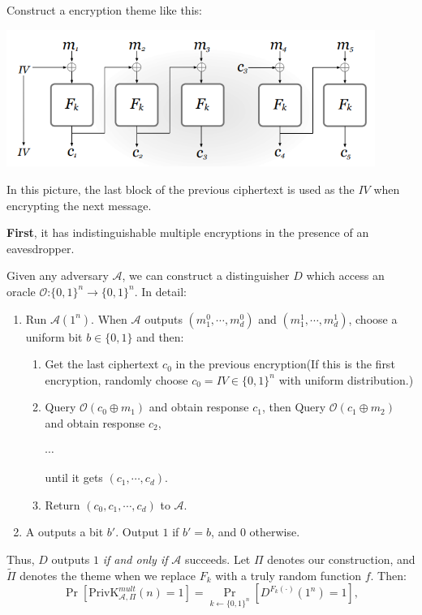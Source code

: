 \documentclass[12pt]{article}
\newcommand{\privk}{\text{PrivK}}
\newcommand{\A}{\mathcal{A}}
\newcommand{\OO}{\mathcal{O}}
\newenvironment{problem}[2][Problem]{\begin{trivlist}
\item[\hskip \labelsep {\bfseries #1}\hskip \labelsep {\bfseries #2.}]}{\end{trivlist}}
\begin{document}
\begin{problem}{3.11}
Construct a encryption theme like this:\par
\begin{center}
    \includegraphics[width=12cm]{1.png}
\end{center}
In this picture, the last block of the previous ciphertext is used
as the $IV$ when encrypting the next message.\par\vspace{2ex}
\textbf{First}, it has indistinguishable multiple encryptions in
the presence of an eavesdropper.\par
Given any adversary $\A$, we can construct a distinguisher $D$ which access an oracle $\OO$:$\{0,1\}^n\rightarrow\{0,1\}^n$. In detail:
\begin{enumerate}
    \item Run $\A(1^n)$. When $\A$ outputs $(m_1^0,\cdots,m_d^0)$ and $(m_1^1,\cdots,m_d^1)$, choose a uniform bit $b\in\{0,1\}$ and then:
    \begin{enumerate}
        \item Get the last ciphertext $c_0$ in the previous encryption(If this is the first encryption, randomly choose $c_0=IV\in\{0,1\}^n$ with uniform distribution.)
        \item Query $\OO(c_0\oplus m_1)$ and obtain response $c_1$, then Query $\OO(c_1\oplus m_2)$ and obtain response $c_2$,\par
        $\cdots$ \par
        until it gets $(c_1,\cdots,c_d)$.
        \item Return $(c_0,c_1,\cdots,c_d)$ to $\A$.
    \end{enumerate}
    \item  A outputs a bit $b'$. Output $1$ if $b'=b$, and $0$ otherwise. 
\end{enumerate}
Thus, $D$ outputs $1$ \textit{if and only if} $\A$ succeeds. Let $\Pi$ denotes our construction, and $\widetilde{\Pi}$ denotes the theme when we replace $F_k$ with a truly random function $f$. Then:
\[\Pr[\privk_{\A,\Pi}^{mult}(n)=1]=\Pr_{k\leftarrow\{0,1\}^n}[D^{F_k(\cdot)}(1^n)=1],\]

\end{problem}
\end{document}
